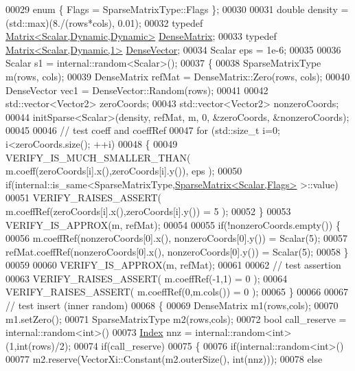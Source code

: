 \begin{DoxyCode}
00029   \textcolor{keyword}{enum} \{ Flags = SparseMatrixType::Flags \};
00030 
00031   \textcolor{keywordtype}{double} density = (std::max)(8./(rows*cols), 0.01);
00032   \textcolor{keyword}{typedef} \hyperlink{group___core___module}{Matrix<Scalar,Dynamic,Dynamic>} 
      \hyperlink{group___core___module}{DenseMatrix};
00033   \textcolor{keyword}{typedef} \hyperlink{group___core___module}{Matrix<Scalar,Dynamic,1>} \hyperlink{group___core___module}{DenseVector};
00034   Scalar eps = 1e-6;
00035 
00036   Scalar s1 = internal::random<Scalar>();
00037   \{
00038     SparseMatrixType m(rows, cols);
00039     DenseMatrix refMat = DenseMatrix::Zero(rows, cols);
00040     DenseVector vec1 = DenseVector::Random(rows);
00041 
00042     std::vector<Vector2> zeroCoords;
00043     std::vector<Vector2> nonzeroCoords;
00044     initSparse<Scalar>(density, refMat, m, 0, &zeroCoords, &nonzeroCoords);
00045 
00046     \textcolor{comment}{// test coeff and coeffRef}
00047     \textcolor{keywordflow}{for} (std::size\_t i=0; i<zeroCoords.size(); ++i)
00048     \{
00049       VERIFY\_IS\_MUCH\_SMALLER\_THAN( m.coeff(zeroCoords[i].x(),zeroCoords[i].y()), eps );
00050       \textcolor{keywordflow}{if}(internal::is\_same<SparseMatrixType,\hyperlink{group___sparse_core___module_class_eigen_1_1_sparse_matrix}{SparseMatrix<Scalar,Flags>} >::value)
00051         VERIFY\_RAISES\_ASSERT( m.coeffRef(zeroCoords[i].x(),zeroCoords[i].y()) = 5 );
00052     \}
00053     VERIFY\_IS\_APPROX(m, refMat);
00054 
00055     \textcolor{keywordflow}{if}(!nonzeroCoords.empty()) \{
00056       m.coeffRef(nonzeroCoords[0].x(), nonzeroCoords[0].y()) = Scalar(5);
00057       refMat.coeffRef(nonzeroCoords[0].x(), nonzeroCoords[0].y()) = Scalar(5);
00058     \}
00059 
00060     VERIFY\_IS\_APPROX(m, refMat);
00061 
00062       \textcolor{comment}{// test assertion}
00063       VERIFY\_RAISES\_ASSERT( m.coeffRef(-1,1) = 0 );
00064       VERIFY\_RAISES\_ASSERT( m.coeffRef(0,m.cols()) = 0 );
00065     \}
00066 
00067     \textcolor{comment}{// test insert (inner random)}
00068     \{
00069       DenseMatrix m1(rows,cols);
00070       m1.setZero();
00071       SparseMatrixType m2(rows,cols);
00072       \textcolor{keywordtype}{bool} call\_reserve = internal::random<int>()%
00073       \hyperlink{namespace_eigen_a62e77e0933482dafde8fe197d9a2cfde}{Index} nnz = internal::random<int>(1,int(rows)/2);
00074       \textcolor{keywordflow}{if}(call\_reserve)
00075       \{
00076         \textcolor{keywordflow}{if}(internal::random<int>()%
00077           m2.reserve(VectorXi::Constant(m2.outerSize(), int(nnz)));
00078         \textcolor{keywordflow}{else}

\end{DoxyCode}

